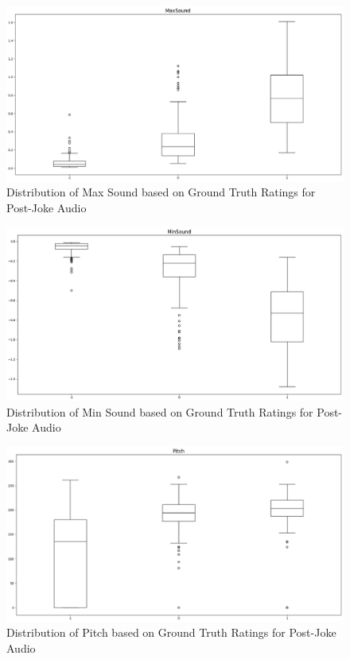 \documentclass[onecolumn, draftclsnofoot,10pt, compsoc]{IEEEtran}
\begin{document}
\begin{figure}[!h]
\includegraphics[width=\linewidth]{assets/fig3.eps}
\caption{Distribution of Max Sound based on Ground Truth Ratings for Post-Joke Audio}
\end{figure}

\begin{figure}[!h]
\includegraphics[width=\linewidth]{assets/fig4.eps}
\caption{Distribution of Min Sound based on Ground Truth Ratings for Post-Joke Audio}
\end{figure}

\begin{figure}[!h]
\includegraphics[width=\linewidth]{assets/fig5.eps}
\caption{Distribution of Pitch based on Ground Truth Ratings for Post-Joke Audio}
\end{figure}
\end{document}

